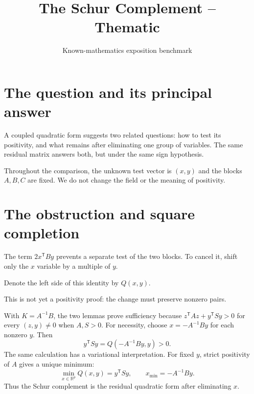 \documentclass[12pt,reqno]{amsart}
\title{The Schur Complement -- Thematic}
\author{Known-mathematics exposition benchmark}
\date{}
\begin{document}
\maketitle
\section{The question and its principal answer}
A coupled quadratic form suggests two related questions: how to test its
positivity, and what remains after eliminating one group of variables.
The same residual matrix answers both, but under the same sign hypothesis.
\begin{theorem}\label{thm:main}

\end{theorem}
Throughout the comparison, the unknown test vector is $(x,y)$ and the
blocks $A,B,C$ are fixed. We do not change the field or the meaning of positivity.

\section{The obstruction and square completion}
The term $2x^{\mathsf T}By$ prevents a separate test of the two blocks.
To cancel it, shift only the $x$ variable by a multiple of $y$.
\begin{lemma}\label{lem:square}

\end{lemma}
Denote the left side of this identity by $Q(x,y)$.

This is not yet a positivity proof: the change must preserve nonzero pairs.
\begin{lemma}\label{lem:inverse}

\end{lemma}
With $K=A^{-1}B$, the two lemmas prove sufficiency because
$z^{\mathsf T}Az+y^{\mathsf T}Sy>0$ for every $(z,y)\ne0$ when $A,S>0$.
For necessity, choose $x=-A^{-1}By$ for each nonzero $y$. Then
\[
 y^{\mathsf T}Sy=Q(-A^{-1}By,y)>0.
\]
The same calculation has a variational interpretation. For fixed $y$,
strict positivity of $A$ gives a unique minimum:
\[
 \min_{x\in\mathbb R^p}Q(x,y)=y^{\mathsf T}Sy,
 \qquad x_{\min}=-A^{-1}By.
\]
Thus the Schur complement is the residual quadratic form after eliminating $x$.
\end{document}
